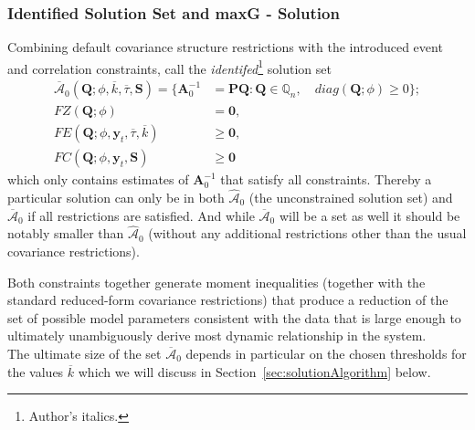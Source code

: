 \documentclass[a4paper,11pt,listof=nochaptergap,oneside,pointednumbers,bibtotoc,bigheadings,liststotoc,hidelinks]{scrbook}
\theoremstyle{mysatz}
\theoremstyle{mydefinition}
\theoremstyle{mytheorem}
\theoremstyle{mybemerkung}
\let\oldhat\hat
\newcommand{\vect}[1]{\boldsymbol{\mathbf{#1}}}
\newcommand{\hatt}[1]{\oldhat{\boldsymbol{\mathbf{#1}}}}
\begin{document}
\subsubsection{Identified Solution Set and maxG - Solution}
Combining default covariance structure restrictions with the introduced event and correlation constraints, \citet{ludvigsonetal:18,ludvigsonetal:19} call the \textit{identifed}\footnote{Author's italics.} solution set 
\begin{equation} \label{eq:svar_ludvi14}
\begin{split}
\overline{\vect{\mathcal{A}}}_0(\vect{Q}; \phi, \overline{k}, \overline{\tau}, \vect{S})  = \{\vect{A}_0^{-1} & = \vect{P}\vect{Q}: \vect{Q} \in \mathbb{Q}_n, \quad diag(\vect{Q}; \phi) \geq 0\}; \\
			FZ(\vect{Q}; \phi) & = \vect{0}, \\
			FE(\vect{Q}; \phi, \vect{y}_t, \overline{\tau}, \overline{k}) & \geq \vect{0}, \\
			FC(\vect{Q}; \phi, \vect{y}_t, \vect{S}) & \geq \vect{0}
\end{split}								
\end{equation}
which only contains estimates of $\vect{A}_0^{-1}$ that satisfy all constraints. Thereby a particular solution can only be in both $\hatt{\mathcal{A}}_0$ (the unconstrained solution set) and $\overline{\vect{\mathcal{A}}}_0$ if all restrictions are satisfied. And while $\overline{\vect{\mathcal{A}}}_0$ will be a set as well it should be notably smaller than $\hatt{\mathcal{A}}_0$ (without any additional restrictions other than the usual covariance restrictions).

Both constraints together generate moment inequalities (together with the standard reduced-form covariance restrictions) that produce a reduction of the set of possible model parameters consistent with the data that is large enough to ultimately unambiguously derive most dynamic relationship in the system.\\

The ultimate size of the set $\overline{\vect{\mathcal{A}}}_0$ depends in particular on the chosen thresholds for the values $\overline{k}$ which we will discuss in Section~\ref{sec:solutionAlgorithm} below.
\end{document}
